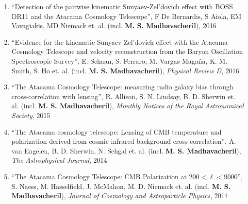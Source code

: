 \documentclass[10pt,margin]{res}
\begin{document}
\begin{resume}
\begin{enumerate}
\item ``Detection of the pairwise kinematic Sunyaev-Zel'dovich effect with BOSS DR11 and the Atacama Cosmology Telescope'', F De Bernardis, S Aiola, EM Vavagiakis, MD Niemack et. al. (incl. {\bf M. S. Madhavacheril}), 2016
\item ``Evidence for the kinematic Sunyaev-Zel’dovich effect with the Atacama Cosmology Telescope and velocity reconstruction from the Baryon Oscillation Spectroscopic Survey'', E. Schaan, S. Ferraro, M. Vargas-Magaña, K. M. Smith, S. Ho et. al. (incl. {\bf M. S. Madhavacheril}), {\sl Physical Review D}, 2016
\item ``The Atacama Cosmology Telescope: measuring radio galaxy bias through cross-correlation with lensing'', R. Allison, S. N. Lindsay, B. D. Sherwin et. al. (incl. {\bf M. S. Madhavacheril}), {\sl Monthly Notices of the Royal Astronomical Society}, 2015
\item ``The Atacama cosmology telescope: Lensing of CMB temperature and polarization derived from cosmic infrared background cross-correlation'', A. van Engelen, B. D. Sherwin, N. Sehgal et. al. (incl. {\bf M. S. Madhavacheril}), {\sl The Astrophysical Journal}, 2014
\item ``The Atacama Cosmology Telescope: CMB Polarization at $200< \ell< 9000$'', S. Naess, M. Hasselfield, J. McMahon, M. D. Niemack et. al. (incl. {\bf M. S. Madhavacheril}), {\sl Journal of Cosmology and Astroparticle Physics}, 2014
\end{enumerate}

\end{resume}
\end{document}
